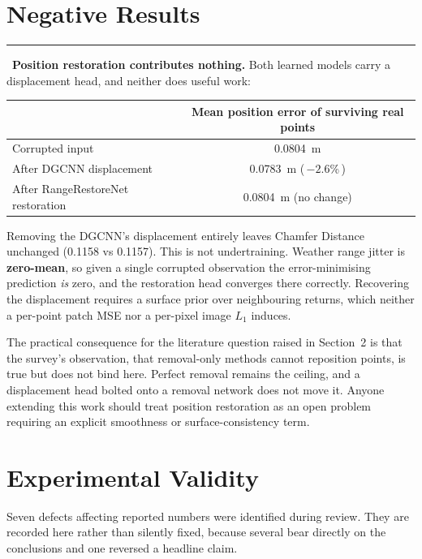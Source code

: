\documentclass[11pt,a4paper]{article}
\newcommand{\keyfinding}[1]{\medskip\noindent\textcolor{accent}{\rule{2pt}{10pt}}\ \textbf{#1}\medskip}
\begin{document}
\section{Negative Results}
\label{sec:negative}

\keyfinding{Position restoration contributes nothing.}
Both learned models carry a displacement head, and neither does useful work:

\begin{table}[H]
\centering\small
\begin{tabular}{lc}
\toprule
& \textbf{Mean position error of surviving real points}\\
\midrule
Corrupted input & 0.0804~m\\
After DGCNN displacement & 0.0783~m (\,$-2.6$\%\,)\\
After RangeRestoreNet restoration & 0.0804~m (no change)\\
\bottomrule
\end{tabular}
\end{table}

Removing the DGCNN's displacement entirely leaves Chamfer Distance unchanged
(0.1158 vs 0.1157). This is not undertraining. Weather range jitter is
\textbf{zero-mean}, so given a single corrupted observation the
error-minimising prediction \emph{is} zero, and the restoration head converges
there correctly. Recovering the displacement requires a surface prior over
neighbouring returns, which neither a per-point patch MSE nor a per-pixel
image $L_1$ induces.

The practical consequence for the literature question raised in Section~2 is
that the survey's observation, that removal-only methods cannot reposition
points, is true but does not bind here. Perfect removal remains the
ceiling, and a displacement head bolted onto a removal network does not move
it. Anyone extending this work should treat position restoration as an open
problem requiring an explicit smoothness or surface-consistency term.

\section{Experimental Validity}
\label{sec:validity}

Seven defects affecting reported numbers were identified during review. They
are recorded here rather than silently fixed, because several bear directly
on the conclusions and one reversed a headline claim.
\end{document}

